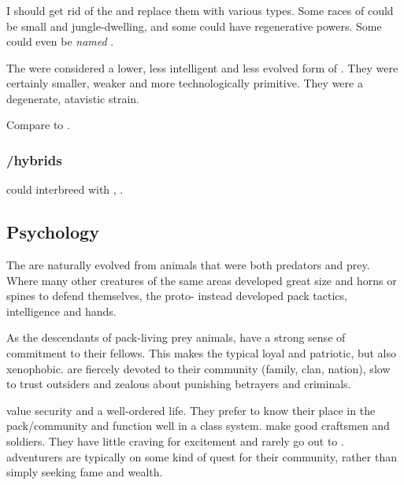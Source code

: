 \subsubsection{\Meccara}
I should get rid of the \meccara and replace them with various \demiscatha types. 
Some races of \demiscathae could be small and jungle-dwelling, and some could have regenerative powers. 
Some could even be \emph{named} \quo{\meccara}. 

The \meccara were considered a lower, less intelligent and less evolved form of \scathae. 
They were certainly smaller, weaker and more technologically primitive.
They were a degenerate, atavistic strain.

Compare to \cite{RobertEHoward:WormsoftheEarth}. 





\subsubsection{\Scatha/\naga hybrids}
\Scathae could interbreed with \nagae, . 









\subsection{Psychology}
The \scathae{} are naturally evolved from animals that were both predators and prey. Where many other creatures of the same areas developed great size and horns or spines to defend themselves, the proto-\scathae{} instead developed pack tactics, intelligence and hands. 

As the descendants of pack-living prey animals, \scathae{} have a strong sense of commitment to their fellows. This makes the typical \scatha{} loyal and patriotic, but also xenophobic. \Scathae{} are fiercely devoted to their community (family, clan, nation), slow to trust outsiders and zealous about punishing betrayers and criminals. 

\Scathae{} value security and a well-ordered life. They prefer to know their place in the pack/community and function well in a class system. \Scathae{} make good craftsmen and soldiers. They have little craving for excitement and rarely go out to . \Scathaese{} adventurers are typically on some kind of quest for their community, rather than simply seeking fame and wealth. 





